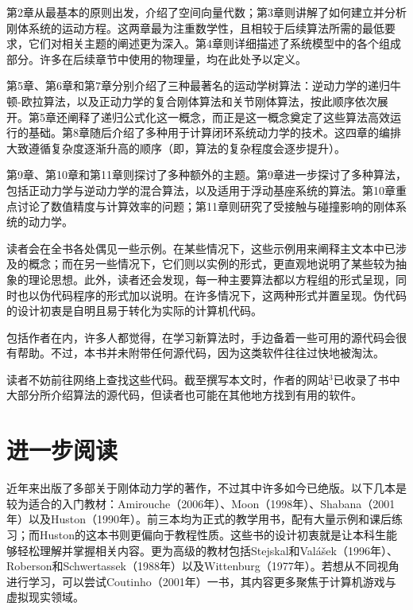 \documentclass[10pt,a4paper]{book}
\theoremstyle{thmstyle} %
\theoremstyle{defstyle} %
\theoremstyle{prostyle} %
\begin{document}
第2章从最基本的原则出发，介绍了空间向量代数；第3章则讲解了如何建立并分析刚体系统的运动方程。这两章最为注重数学性，且相较于后续算法所需的最低要求，它们对相关主题的阐述更为深入。第4章则详细描述了系统模型中的各个组成部分。许多在后续章节中使用的物理量，均在此处予以定义。



第5章、第6章和第7章分别介绍了三种最著名的运动学树算法：逆动力学的递归牛顿-欧拉算法，以及正动力学的复合刚体算法和关节刚体算法，按此顺序依次展开。第5章还阐释了递归公式化这一概念，而正是这一概念奠定了这些算法高效运行的基础。第8章随后介绍了多种用于计算闭环系统动力学的技术。这四章的编排大致遵循复杂度逐渐升高的顺序（即，算法的复杂程度会逐步提升）。



第9章、第10章和第11章则探讨了多种额外的主题。第9章进一步探讨了多种算法，包括正动力学与逆动力学的混合算法，以及适用于浮动基座系统的算法。第10章重点讨论了数值精度与计算效率的问题；第11章则研究了受接触与碰撞影响的刚体系统的动力学。



读者会在全书各处偶见一些示例。在某些情况下，这些示例用来阐释主文本中已涉及的概念；而在另一些情况下，它们则以实例的形式，更直观地说明了某些较为抽象的理论思想。此外，读者还会发现，每一种主要算法都以方程组的形式呈现，同时也以伪代码程序的形式加以说明。在许多情况下，这两种形式并置呈现。伪代码的设计初衷是自明且易于转化为实际的计算机代码。



包括作者在内，许多人都觉得，在学习新算法时，手边备着一些可用的源代码会很有帮助。不过，本书并未附带任何源代码，因为这类软件往往过快地被淘汰。



读者不妨前往网络上查找这些代码。截至撰写本文时，作者的网站$^{3}$已收录了书中大部分所介绍算法的源代码，但读者也可能在其他地方找到有用的软件。



\section{进一步阅读}





近年来出版了多部关于刚体动力学的著作，不过其中许多如今已绝版。以下几本是较为适合的入门教材：Amirouche（2006年）、Moon（1998年）、Shabana（2001年）以及Huston（1990年）。前三本均为正式的教学用书，配有大量示例和课后练习；而Huston的这本书则更偏向于教程性质。这些书的设计初衷就是让本科生能够轻松理解并掌握相关内容。更为高级的教材包括Stejskal和Valášek（1996年）、Roberson和Schwertassek（1988年）以及Wittenburg（1977年）。若想从不同视角进行学习，可以尝试Coutinho（2001年）一书，其内容更多聚焦于计算机游戏与虚拟现实领域。
\end{document}

